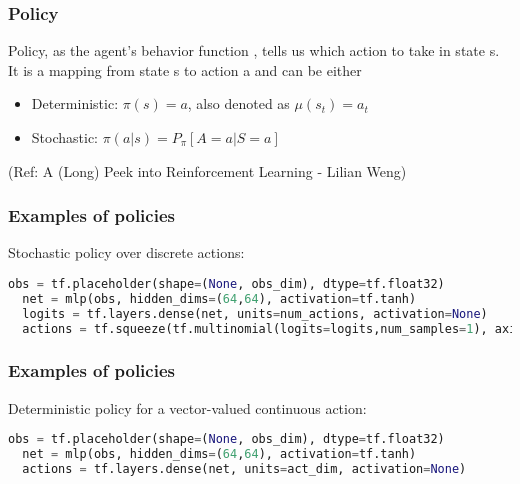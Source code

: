 \begin{frame}[fragile]\frametitle{Policy}

Policy, as the agent's behavior function  , tells us which action to take in state s. It is a mapping from
state s to action a and can be either 

\begin{itemize}
\item Deterministic: $\pi(s)=a$, also denoted as $\mu(s_t)=a_t$
\item Stochastic: $\pi (a|s) = P_{\pi}[A=a|S=a]$
\end{itemize}


{\tiny (Ref: A (Long) Peek into Reinforcement Learning - Lilian Weng)}

\end{frame}

\begin{frame}[fragile]\frametitle{Examples of policies}

Stochastic policy over discrete actions:

\begin{lstlisting}[language=python]
  obs = tf.placeholder(shape=(None, obs_dim), dtype=tf.float32)
  net = mlp(obs, hidden_dims=(64,64), activation=tf.tanh)
  logits = tf.layers.dense(net, units=num_actions, activation=None)
  actions = tf.squeeze(tf.multinomial(logits=logits,num_samples=1), axis=1)
\end{lstlisting}




\end{frame}

\begin{frame}[fragile]\frametitle{Examples of policies}

Deterministic policy for a vector-valued continuous action:

\begin{lstlisting}[language=python]
  obs = tf.placeholder(shape=(None, obs_dim), dtype=tf.float32)
  net = mlp(obs, hidden_dims=(64,64), activation=tf.tanh)
  actions = tf.layers.dense(net, units=act_dim, activation=None)
\end{lstlisting}




\end{frame}


